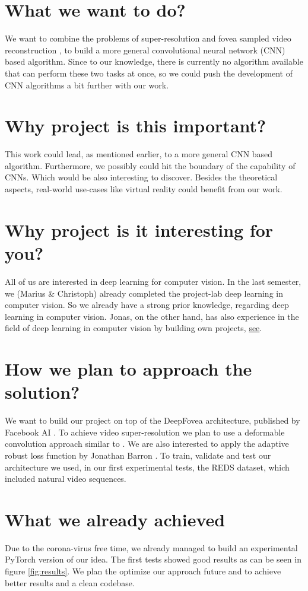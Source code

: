 \documentclass[10pt,twocolumn,letterpaper]{article}
\begin{document}
\section{What we want to do?}
We want to combine the problems of super-resolution \cite{valillasuperres} and fovea sampled video reconstruction \cite{kaplanyan2019deepfovea}, to build a more general convolutional neural network (CNN) \cite{cnn} based algorithm. Since to our knowledge, there is currently no algorithm available that can perform these two tasks at once, so we could push the development of CNN algorithms a bit further with our work.

\section{Why project is this important?}
This work could lead, as mentioned earlier, to a more general CNN based algorithm. Furthermore, we possibly could hit the boundary of the capability of CNNs. Which would be also interesting to discover. Besides the theoretical aspects, real-world use-cases like virtual reality could benefit from our work. \cite{kaplanyan2019deepfovea}

\section{Why project is it interesting for you?}
All of us are interested in deep learning for computer vision. In the last semester, we (Marius \& Christoph) already completed the project-lab deep learning in computer vision. So we already have a strong prior knowledge, regarding deep learning in computer vision.
Jonas, on the other hand, has also experience in the field of deep learning in computer vision by building own projects, \href{https://github.com/jonasgrebe/tf-pokemon-generation}{see}. 

\section{How we plan to approach the solution?}
We want to build our project on top of the DeepFovea architecture, published by Facebook AI \cite{kaplanyan2019deepfovea}. To achieve video super-resolution we plan to use a deformable convolution approach similar to \cite{deformablesuperres, deformableconv}. We are also interested to apply the adaptive robust loss function by Jonathan Barron \cite{adaptiveroubustloss}. To train, validate and test our architecture we used, in our first experimental tests, the REDS dataset, which included natural video sequences. \cite{REDS}

\section{What we already achieved}
Due to the corona-virus free time, we already managed to build an experimental PyTorch \cite{pytorch} version of our idea. The first tests showed good results as can be seen in figure \ref{fig:results}. We plan the optimize our approach future and to achieve better results and a clean codebase.

{
    
    
}
\end{document}
